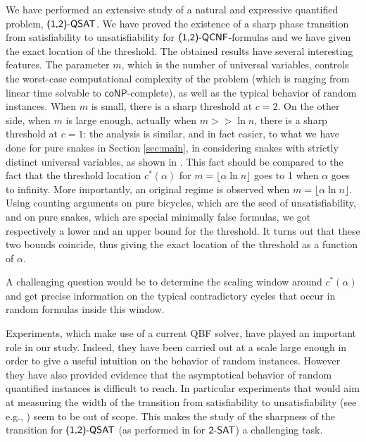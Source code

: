 \documentclass[aop,noinfoline]{imsart}
\newcommand{\onetwo}{(1,2)}
\newcommand{\onetwoqsat}{\mbox{\sf (1,2)-QSAT}}
\newcommand{\twosat}{\mbox{\sf 2-SAT}}
\newcommand{\onetwoqcnf}{\mbox{\sf \onetwo-QCNF}}
\newcommand{\conp}{\mathsf{coNP}}
\begin{document}
We have performed an extensive study of a natural and expressive
quantified problem, $\onetwoqsat$. We have proved the existence of
a sharp phase transition from satisfiability to unsatisfiability
for $\onetwoqcnf$-formulas and we have given the exact location of the
threshold. The obtained results have several interesting features.
The  parameter  $m$, which is the number of universal variables,
controls the worst-case computational complexity of the problem
(which is ranging from linear time solvable to $\conp$-complete),
as well as the typical behavior of random instances.    When $m$
is small, there is a sharp threshold at $c=2$. On the other side,
when $m$ is large enough, actually   when $m>> \ln n$, there is a
sharp threshold at $c=1$: the analysis is similar, and in fact
easier, to what we have done for pure snakes in Section
\ref{sec:main}, in considering snakes with strictly distinct
universal variables, as shown in \cite{CreignouDER-08}. This fact should be compared to the fact
that the threshold location $c^*(\alpha)$ for $m=\lfloor \alpha\ln
n\rfloor$ goes to 1 when $\alpha$ goes to infinity. More
importantly, an original regime is observed when $m=\lfloor
\alpha\ln n\rfloor$. Using counting arguments on pure bicycles,
which are the seed of unsatisfiability, and on pure snakes, which
are special minimally false formulas, we got respectively a lower
and an upper bound for the threshold. It turns out that these two
bounds coincide, thus giving the exact location of the threshold
as a function of $\alpha$. 

A challenging question would be to determine the scaling window around
$c^*(\alpha)$ and get precise information on the typical contradictory
cycles that occur in random formulas inside this window.  

\iffalse

Experiments, which make use of a current QBF solver, have played an
important role in our study. Indeed, they have been carried out at a
scale large enough in order to give a useful intuition on the
behavior of random instances. However they have also
provided evidence that the asymptotical behavior of random quantified
instances is difficult to reach.
In particular experiments that would aim at measuring the width of the
transition   from satisfiability to unsatisfiability (see e.g.,
\cite{Wilson-02}) seem to be out of scope.
This makes the study of the sharpness of the  transition for $\onetwoqsat$
(as performed in \cite{Bollobasetal01} for $\twosat$) a challenging task.
\end{document}
